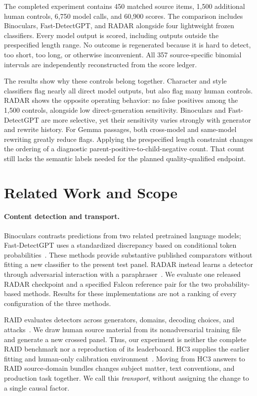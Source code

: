 The completed experiment contains 450 matched source items, 1,500 additional human controls, 6,750 model calls, and 60,900 scores. The comparison includes Binoculars, Fast-DetectGPT, and RADAR alongside four lightweight frozen classifiers. Every model output is scored, including outputs outside the prespecified length range. No outcome is regenerated because it is hard to detect, too short, too long, or otherwise inconvenient. All 357 source-specific binomial intervals are independently reconstructed from the score ledger.

The results show why these controls belong together. Character and style classifiers flag nearly all direct model outputs, but also flag many human controls. RADAR shows the opposite operating behavior: no false positives among the 1,500 controls, alongside low direct-generation sensitivity. Binoculars and Fast-DetectGPT are more selective, yet their sensitivity varies strongly with generator and rewrite history. For Gemma passages, both cross-model and same-model rewriting greatly reduce flags. Applying the prespecified length constraint changes the ordering of a diagnostic parent-positive-to-child-negative count. That count still lacks the semantic labels needed for the planned quality-qualified endpoint.

\section{Related Work and Scope}
\paragraph{Content detection and transport.}
Binoculars contrasts predictions from two related pretrained language models; Fast-DetectGPT uses a standardized discrepancy based on conditional token probabilities~\cite{hans2024,bao2024}. These methods provide substantive published comparators without fitting a new classifier to the present test panel. RADAR instead learns a detector through adversarial interaction with a paraphraser~\cite{hu2023}. We evaluate one released RADAR checkpoint and a specified Falcon reference pair for the two probability-based methods. Results for these implementations are not a ranking of every configuration of the three methods.

RAID evaluates detectors across generators, domains, decoding choices, and attacks~\cite{dugan2024}. We draw human source material from its nonadversarial training file and generate a new crossed panel. Thus, our experiment is neither the complete RAID benchmark nor a reproduction of its leaderboard. HC3 supplies the earlier fitting and human-only calibration environment~\cite{guo2023}. Moving from HC3 answers to RAID source-domain bundles changes subject matter, text conventions, and production task together. We call this \emph{transport}, without assigning the change to a single causal factor.

